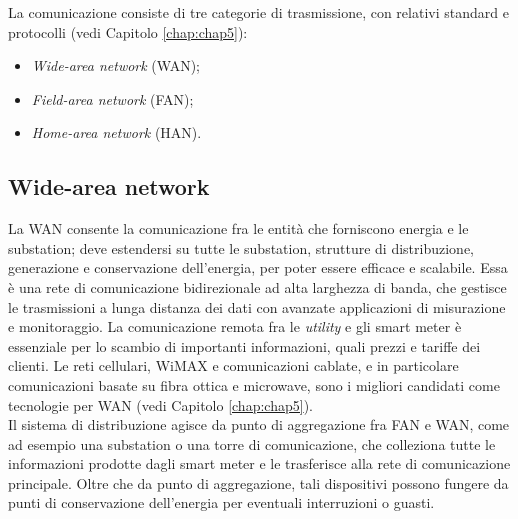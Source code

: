 
La comunicazione consiste di tre categorie di trasmissione, con relativi standard e protocolli (vedi Capitolo \ref{chap:chap5}):
\begin{itemize}
	\item \emph{Wide-area network} (WAN);
	\item \emph{Field-area network} (FAN);
	\item \emph{Home-area network} (HAN).
\end{itemize}

\subsection{Wide-area network}
La WAN consente la comunicazione fra le entità che forniscono energia e le substation; deve estendersi su tutte le substation, strutture di distribuzione, generazione e conservazione dell'energia, per poter essere efficace e scalabile. Essa è una rete di comunicazione bidirezionale ad alta larghezza di banda, che gestisce le trasmissioni a lunga distanza dei dati con avanzate applicazioni di misurazione e monitoraggio. La comunicazione remota fra le \emph{utility} e gli smart meter è essenziale per lo scambio di importanti informazioni, quali prezzi e tariffe dei clienti. Le reti cellulari, WiMAX e comunicazioni cablate, e in particolare comunicazioni basate su fibra ottica e microwave, sono i migliori candidati come tecnologie per WAN (vedi Capitolo \ref{chap:chap5}).
\\
Il sistema di distribuzione agisce da punto di aggregazione fra FAN e WAN, come ad esempio una substation o una torre di comunicazione, che colleziona tutte le informazioni prodotte dagli smart meter e le trasferisce alla rete di comunicazione principale. Oltre che da punto di aggregazione, tali dispositivi possono fungere da punti di conservazione dell'energia per eventuali interruzioni o guasti.

